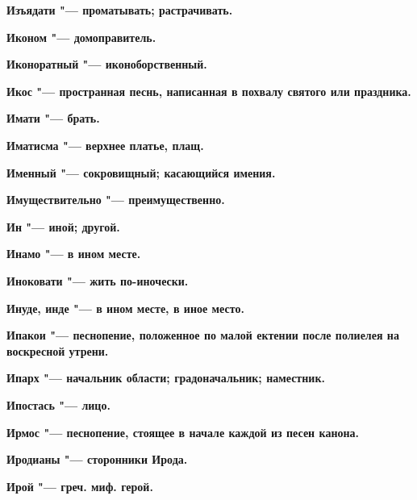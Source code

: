\bfseries Изъядати \normalfont{} "--- проматывать; растрачивать. 




\bfseries Иконом \normalfont{} "--- домоправитель. 




\bfseries Иконоратный \normalfont{} "--- иконоборственный. 




\bfseries Икос \normalfont{} "--- пространная песнь, написанная в похвалу святого или праздника. 




\bfseries Имати \normalfont{} "--- брать. 




\bfseries Иматисма \normalfont{} "--- верхнее платье, плащ. 




\bfseries Именный \normalfont{} "--- сокровищный; касающийся имения. 




\bfseries Имуществительно \normalfont{} "--- преимущественно. 




\bfseries Ин \normalfont{} "--- иной; другой. 




\bfseries Инамо \normalfont{} "--- в ином месте. 




\bfseries Иноковати \normalfont{} "--- жить по-иночески. 




\bfseries Инуде, инде \normalfont{} "--- в ином месте, в иное место. 




\bfseries Ипакои \normalfont{} "--- песнопение, положенное по малой ектении после полиелея на воскресной утрени. 




\bfseries Ипарх \normalfont{} "--- начальник области; градоначальник; наместник. 




\bfseries Ипостась \normalfont{} "--- лицо. 




\bfseries Ирмос \normalfont{} "--- песнопение, стоящее в начале каждой из песен канона. 




\bfseries Иродианы \normalfont{} "--- сторонники Ирода. 




\bfseries Ирой \normalfont{} "--- греч. миф. герой. 




